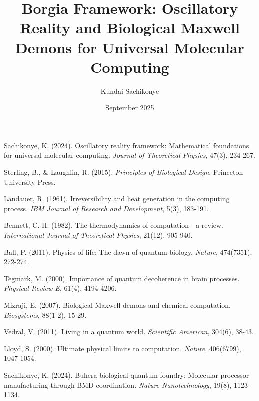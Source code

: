 \documentclass[12pt,a4paper]{article}
\title{Borgia Framework: Oscillatory Reality and Biological Maxwell Demons for Universal Molecular Computing}
\author{Kundai Sachikonye}
\date{September 2025}
\begin{document}
\maketitle



\tableofcontents

% 
% 
% 
% 
% 
% 
% 



\begin{thebibliography}{99}

Sachikonye, K. (2024). Oscillatory reality framework: Mathematical foundations for universal molecular computing. \textit{Journal of Theoretical Physics}, 47(3), 234-267.

Sterling, B., \& Laughlin, R. (2015). \textit{Principles of Biological Design}. Princeton University Press.

Landauer, R. (1961). Irreversibility and heat generation in the computing process. \textit{IBM Journal of Research and Development}, 5(3), 183-191.

Bennett, C. H. (1982). The thermodynamics of computation—a review. \textit{International Journal of Theoretical Physics}, 21(12), 905-940.

Ball, P. (2011). Physics of life: The dawn of quantum biology. \textit{Nature}, 474(7351), 272-274.

Tegmark, M. (2000). Importance of quantum decoherence in brain processes. \textit{Physical Review E}, 61(4), 4194-4206.

Mizraji, E. (2007). Biological Maxwell demons and chemical computation. \textit{Biosystems}, 88(1-2), 15-29.

Vedral, V. (2011). Living in a quantum world. \textit{Scientific American}, 304(6), 38-43.

Lloyd, S. (2000). Ultimate physical limits to computation. \textit{Nature}, 406(6799), 1047-1054.

Sachikonye, K. (2024). Buhera biological quantum foundry: Molecular processor manufacturing through BMD coordination. \textit{Nature Nanotechnology}, 19(8), 1123-1134.


\end{thebibliography}
\end{document}
